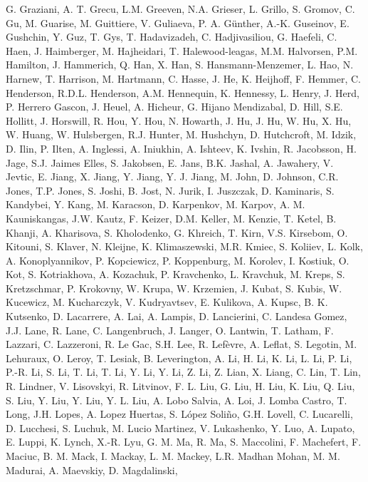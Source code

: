 G. Graziani,
A. T. Grecu,
L.M. Greeven,
N.A. Grieser,
L. Grillo,
S. Gromov,
C.  Gu,
M. Guarise,
M. Guittiere,
V. Guliaeva,
P. A. G{\"u}nther,
A.-K. Guseinov,
E. Gushchin,
Y. Guz,
T. Gys,
T. Hadavizadeh,
C. Hadjivasiliou,
G. Haefeli,
C. Haen,
J. Haimberger,
M. Hajheidari,
T. Halewood-leagas,
M.M. Halvorsen,
P.M. Hamilton,
J. Hammerich,
Q. Han,
X. Han,
S. Hansmann-Menzemer,
L. Hao,
N. Harnew,
T. Harrison,
M. Hartmann,
C. Hasse,
J. He,
K. Heijhoff,
F. Hemmer,
C. Henderson,
R.D.L. Henderson,
A.M. Hennequin,
K. Hennessy,
L. Henry,
J. Herd,
P. Herrero Gascon,
J. Heuel,
A. Hicheur,
G. Hijano Mendizabal,
D. Hill,
S.E. Hollitt,
J. Horswill,
R. Hou,
Y. Hou,
N. Howarth,
J. Hu,
J. Hu,
W. Hu,
X. Hu,
W. Huang,
W. Hulsbergen,
R.J. Hunter,
M. Hushchyn,
D. Hutchcroft,
M. Idzik,
D. Ilin,
P. Ilten,
A. Inglessi,
A. Iniukhin,
A. Ishteev,
K. Ivshin,
R. Jacobsson,
H. Jage,
S.J. Jaimes Elles,
S. Jakobsen,
E. Jans,
B.K. Jashal,
A. Jawahery,
V. Jevtic,
E. Jiang,
X. Jiang,
Y. Jiang,
Y. J.  Jiang,
M. John,
D. Johnson,
C.R. Jones,
T.P. Jones,
S. Joshi,
B. Jost,
N. Jurik,
I. Juszczak,
D. Kaminaris,
S. Kandybei,
Y. Kang,
M. Karacson,
D. Karpenkov,
M. Karpov,
A. M.  Kauniskangas,
J.W. Kautz,
F. Keizer,
D.M. Keller,
M. Kenzie,
T. Ketel,
B. Khanji,
A. Kharisova,
S. Kholodenko,
G. Khreich,
T. Kirn,
V.S. Kirsebom,
O. Kitouni,
S. Klaver,
N. Kleijne,
K. Klimaszewski,
M.R. Kmiec,
S. Koliiev,
L. Kolk,
A. Konoplyannikov,
P. Kopciewicz,
P. Koppenburg,
M. Korolev,
I. Kostiuk,
O. Kot,
S. Kotriakhova,
A. Kozachuk,
P. Kravchenko,
L. Kravchuk,
M. Kreps,
S. Kretzschmar,
P. Krokovny,
W. Krupa,
W. Krzemien,
J. Kubat,
S. Kubis,
W. Kucewicz,
M. Kucharczyk,
V. Kudryavtsev,
E. Kulikova,
A. Kupsc,
B. K.  Kutsenko,
D. Lacarrere,
A. Lai,
A. Lampis,
D. Lancierini,
C. Landesa Gomez,
J.J. Lane,
R. Lane,
C. Langenbruch,
J. Langer,
O. Lantwin,
T. Latham,
F. Lazzari,
C. Lazzeroni,
R. Le Gac,
S.H. Lee,
R. Lef{\`e}vre,
A. Leflat,
S. Legotin,
M. Lehuraux,
O. Leroy,
T. Lesiak,
B. Leverington,
A. Li,
H. Li,
K. Li,
L. Li,
P. Li,
P.-R. Li,
S. Li,
T. Li,
T. Li,
Y. Li,
Y. Li,
Z. Li,
Z. Lian,
X. Liang,
C. Lin,
T. Lin,
R. Lindner,
V. Lisovskyi,
R. Litvinov,
F. L.  Liu,
G. Liu,
H. Liu,
K. Liu,
Q. Liu,
S. Liu,
Y. Liu,
Y. Liu,
Y. L.  Liu,
A. Lobo Salvia,
A. Loi,
J. Lomba Castro,
T. Long,
J.H. Lopes,
A. Lopez Huertas,
S. L{\'o}pez Soli{\~n}o,
G.H. Lovell,
C. Lucarelli,
D. Lucchesi,
S. Luchuk,
M. Lucio Martinez,
V. Lukashenko,
Y. Luo,
A. Lupato,
E. Luppi,
K. Lynch,
X.-R. Lyu,
G. M.  Ma,
R. Ma,
S. Maccolini,
F. Machefert,
F. Maciuc,
B. M.  Mack,
I. Mackay,
L. M.  Mackey,
L.R. Madhan Mohan,
M. M.  Madurai,
A. Maevskiy,
D. Magdalinski,
